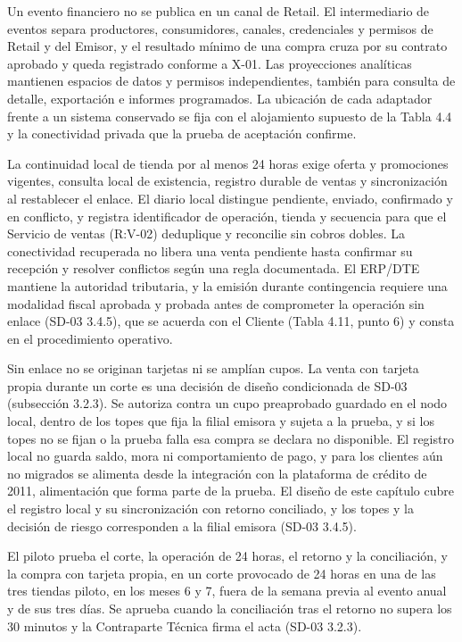 \documentclass[11pt]{article}
\begin{document}
Un evento financiero no se publica en un canal de Retail. El intermediario de eventos separa productores, consumidores, canales, credenciales y permisos de Retail y del Emisor, y el resultado mínimo de una compra cruza por su contrato aprobado y queda registrado conforme a X-01. Las proyecciones analíticas mantienen espacios de datos y permisos independientes, también para consulta de detalle, exportación e informes programados. La ubicación de cada adaptador frente a un sistema conservado se fija con el alojamiento supuesto de la Tabla 4.4 y la conectividad privada que la prueba de aceptación confirme.

La continuidad local de tienda por al menos 24 horas exige oferta y promociones vigentes, consulta local de existencia, registro durable de ventas y sincronización al restablecer el enlace. El diario local distingue pendiente, enviado, confirmado y en conflicto, y registra identificador de operación, tienda y secuencia para que el Servicio de ventas (R:V-02) deduplique y reconcilie sin cobros dobles. La conectividad recuperada no libera una venta pendiente hasta confirmar su recepción y resolver conflictos según una regla documentada. El ERP/DTE mantiene la autoridad tributaria, y la emisión durante contingencia requiere una modalidad fiscal aprobada y probada antes de comprometer la operación sin enlace (SD-03 3.4.5), que se acuerda con el Cliente (Tabla 4.11, punto 6) y consta en el procedimiento operativo.

Sin enlace no se originan tarjetas ni se amplían cupos. La venta con tarjeta propia durante un corte es una decisión de diseño condicionada de SD-03 (subsección 3.2.3). Se autoriza contra un cupo preaprobado guardado en el nodo local, dentro de los topes que fija la filial emisora y sujeta a la prueba, y si los topes no se fijan o la prueba falla esa compra se declara no disponible. El registro local no guarda saldo, mora ni comportamiento de pago, y para los clientes aún no migrados se alimenta desde la integración con la plataforma de crédito de 2011, alimentación que forma parte de la prueba. El diseño de este capítulo cubre el registro local y su sincronización con retorno conciliado, y los topes y la decisión de riesgo corresponden a la filial emisora (SD-03 3.4.5).

El piloto prueba el corte, la operación de 24 horas, el retorno y la conciliación, y la compra con tarjeta propia, en un corte provocado de 24 horas en una de las tres tiendas piloto, en los meses 6 y 7, fuera de la semana previa al evento anual y de sus tres días. Se aprueba cuando la conciliación tras el retorno no supera los 30 minutos y la Contraparte Técnica firma el acta (SD-03 3.2.3).
\end{document}
